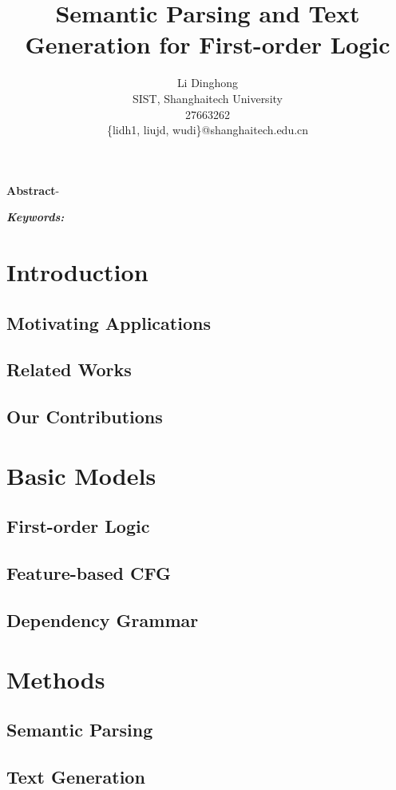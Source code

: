 \documentclass{article}
\title{Semantic Parsing and Text Generation for First-order Logic}
\author{Li Dinghong\\
SIST, Shanghaitech University\\
27663262\\
\{lidh1, liujd, wudi\}@shanghaitech.edu.cn
}
\begin{document}
{
	\newpage
	\maketitle

	\textbf{Abstract}-{}

	\vspace{5pt}
	\textbf{\emph{Keywords:}} {}

	\tableofcontents
}

\section{Introduction}{
	\subsection{Motivating Applications}{
		\cite{su} 
	}

	\subsection{Related Works}{}

	\subsection{Our Contributions}{}
}

\section{Basic Models}{
	\subsection{First-order Logic}{}

	\subsection{Feature-based CFG}{}

	\subsection{Dependency Grammar}{}
}

\section{Methods}{
	\subsection{Semantic Parsing}{}

	\subsection{Text Generation}{}
}
\end{document}
